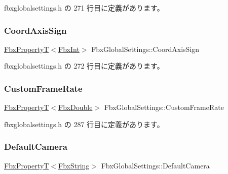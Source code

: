  fbxglobalsettings.\+h の 271 行目に定義があります。

\mbox{\label{class_fbx_global_settings_a852574ae7173bcc4989accb9688ea013}} 
\subsubsection{\texorpdfstring{Coord\+Axis\+Sign}{CoordAxisSign}}
{\footnotesize\ttfamily \hyperlink{class_fbx_property_t}{Fbx\+PropertyT}$<$\hyperlink{fbxtypes_8h_a088fa96de3b0b3ea69f0f6afef525dfb}{Fbx\+Int}$>$ Fbx\+Global\+Settings\+::\+Coord\+Axis\+Sign\hspace{0.3cm}{\ttfamily [protected]}}



 fbxglobalsettings.\+h の 272 行目に定義があります。

\mbox{\label{class_fbx_global_settings_a4d9660899e5c2a3bd45c962f062ffbe5}} 
\subsubsection{\texorpdfstring{Custom\+Frame\+Rate}{CustomFrameRate}}
{\footnotesize\ttfamily \hyperlink{class_fbx_property_t}{Fbx\+PropertyT}$<$\hyperlink{fbxtypes_8h_a171e72a1c46fc15c1a6c9c31948c1c5b}{Fbx\+Double}$>$ Fbx\+Global\+Settings\+::\+Custom\+Frame\+Rate\hspace{0.3cm}{\ttfamily [protected]}}



 fbxglobalsettings.\+h の 287 行目に定義があります。

\mbox{\label{class_fbx_global_settings_ae22135d96da50b31043a31bdf8815daf}} 
\subsubsection{\texorpdfstring{Default\+Camera}{DefaultCamera}}
{\footnotesize\ttfamily \hyperlink{class_fbx_property_t}{Fbx\+PropertyT}$<$\hyperlink{class_fbx_string}{Fbx\+String}$>$ Fbx\+Global\+Settings\+::\+Default\+Camera\hspace{0.3cm}{\ttfamily [protected]}}



